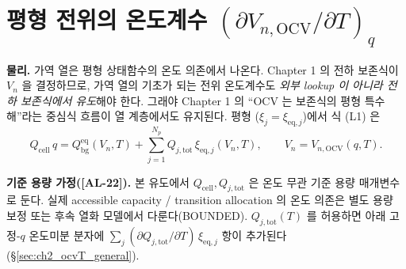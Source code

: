 \documentclass[11pt,a4paper]{article}
\newcommand{\eq}{\mathrm{eq}}
\newcommand{\bg}{\mathrm{bg}}
\newcommand{\cell}{\mathrm{cell}}
\newcommand{\OCV}{\mathrm{OCV}}
\newcommand{\tot}{\mathrm{tot}}
\newcommand{\AL}[1]{\textsf{[AL-#1]}}
\begin{document}
\section{평형 전위의 온도계수 $(\partial V_{n,\OCV}/\partial T)_q$}\label{sec:ch2_ocvT}
\textbf{물리.} 가역 열은 평형 상태함수의 온도 의존에서 나온다. Chapter 1 의 전하 보존식이 $V_n$ 을 결정하므로,
가역 열의 기초가 되는 전위 온도계수도 \emph{외부 lookup 이 아니라 전하 보존식에서 유도}해야 한다. 그래야 Chapter 1 의 ``OCV 는 보존식의 평형 특수해''라는 중심식 흐름이 열 계층에서도 유지된다. 평형
($\xi_j=\xi_{\eq,j}$)에서 식 (L1) 은
\begin{equation}
Q_\cell\,q=Q_\bg^{\eq}(V_n,T)+\sum_{j=1}^{N_p}Q_{j,\tot}\,\xi_{\eq,j}(V_n,T),\qquad V_n=V_{n,\OCV}(q,T).
\label{eq:ch2_eqbal}
\end{equation}

\textbf{기준 용량 가정(\AL{22}).} 본 유도에서 $Q_\cell,Q_{j,\tot}$ 은 온도 무관 기준 용량 매개변수로 둔다.
실제 accessible capacity / transition allocation 의 온도 의존은 별도 용량 보정 또는 후속 열화 모델에서
다룬다(BOUNDED). $Q_{j,\tot}(T)$ 를 허용하면 아래 고정-$q$ 온도미분 분자에 $\sum_j(\partial Q_{j,\tot}/\partial T)\,\xi_{\eq,j}$
항이 추가된다(\S\ref{sec:ch2_ocvT_general}).
\end{document}
